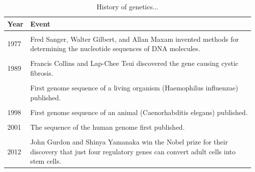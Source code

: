 \documentclass[11pt,ignorenonframetext,aspectratio=169]{beamer}
\begin{document}
\begin{frame}{}
\protect\hypertarget{section-12}{}
\begin{table}

\caption{\label{tab:history-table3}History of genetics...}
\centering
\fontsize{8}{10}\selectfont
\begin{tabular}[t]{l>{\raggedright\arraybackslash}p{40em}}
\toprule
Year & Event\\
\midrule
\cellcolor{gray!6}{1968} & \cellcolor{gray!6}{Motoo Kimura proposed the neutral theory of molecular evolution.}\\
1977 & Fred Sanger, Walter Gilbert, and Allan Maxam invented methods for determining the nucleotide sequences of DNA molecules.\\
\cellcolor{gray!6}{1980} & \cellcolor{gray!6}{Christiane Nüsslein-Volhard and Eric F. Wieschaus defined the complex of genes that regulate body plan development in Drosophila.}\\
1989 & Francis Collins and Lap-Chee Tsui discovered the gene causing cystic fibrosis.\\
\cellcolor{gray!6}{1993} & \cellcolor{gray!6}{Victor Ambrose and colleagues described the first microRNA.}\\
\addlinespace
1995 & First genome sequence of a living organism (Haemophilus influenzae) published.\\
\cellcolor{gray!6}{1996} & \cellcolor{gray!6}{First genome sequence of a eukaryote (Saccharomyces cerevisiae) published.}\\
1998 & First genome sequence of an animal (Caenorhabditis elegans) published.\\
\cellcolor{gray!6}{2000} & \cellcolor{gray!6}{First genome sequence of a plant (Arabidopsis thaliana) published.}\\
2001 & The sequence of the human genome first published.\\
\addlinespace
\cellcolor{gray!6}{2006} & \cellcolor{gray!6}{Andrew Fire and Craig Mello win the Nobel prize for their discovery of gene silencing by double-stranded RNA.}\\
2012 & John Gurdon and Shinya Yamanaka win the Nobel prize for their discovery that just four regulatory genes can convert adult cells into stem cells.\\
\bottomrule
\end{tabular}
\end{table}
\end{frame}
\end{document}
